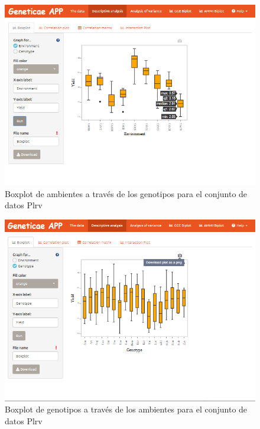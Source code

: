 \begin{figure}[H]
	\begin{center}
		\includegraphics[width=14cm]{./Graficos/Boxplot_environment.png}
	\end{center}
	\caption{Boxplot de ambientes a través de los genotipos para el conjunto de datos Plrv}
	\label{fig:fig43}
\end{figure}


\begin{figure}[H]
	\begin{center}
		\includegraphics[width=14cm]{./Graficos/Boxplot_genotypes.png}
	\end{center}
	\caption{Boxplot de genotipos a través de los ambientes para el conjunto de datos Plrv}
	\label{fig:fig44}
\end{figure}

